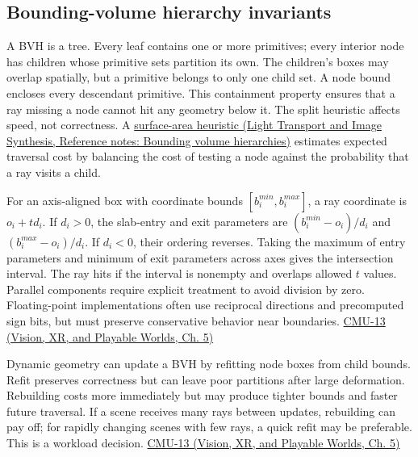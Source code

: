 \subsection{Bounding-volume hierarchy invariants}\label{04-visual-computing-ii-ch029-bounding-volume-hierarchy-invariants}

\hypertarget{04-visual-computing-ii-ch029-bounding-volume-hierarchy-invariants}{}

A BVH is a tree. Every leaf contains one or more primitives; every interior node has children whose primitive sets partition its own. The children's boxes may overlap spatially, but a primitive belongs to only one child set. A node bound encloses every descendant primitive. This containment property ensures that a ray missing a node cannot hit any geometry below it. The split heuristic affects speed, not correctness. A \href{../04-Light-Transport-and-Image-Synthesis/main.pdf\#nameddest=appendix-0b426c47dd78}{surface-area heuristic (Light Transport and Image Synthesis, Reference notes: Bounding volume hierarchies)} estimates expected traversal cost by balancing the cost of testing a node against the probability that a ray visits a child.

For an axis-aligned box with coordinate bounds \([b_i^{min},b_i^{max}]\), a ray coordinate is \(o_i+td_i\). If \(d_i>0\), the slab-entry and exit parameters are \((b_i^{min}-o_i)/d_i\) and \((b_i^{max}-o_i)/d_i\). If \(d_i<0\), their ordering reverses. Taking the maximum of entry parameters and minimum of exit parameters across axes gives the intersection interval. The ray hits if the interval is nonempty and overlaps allowed \(t\) values. Parallel components require explicit treatment to avoid division by zero. Floating-point implementations often use reciprocal directions and precomputed sign bits, but must preserve conservative behavior near boundaries. \href{../07-Vision-XR-and-Playable-Worlds/main.pdf\#nameddest=04-visual-computing-ii-ch036-cmu-13---spatial-data-structures}{CMU-13 (Vision, XR, and Playable Worlds, Ch. 5)}

Dynamic geometry can update a BVH by refitting node boxes from child bounds. Refit preserves correctness but can leave poor partitions after large deformation. Rebuilding costs more immediately but may produce tighter bounds and faster future traversal. If a scene receives many rays between updates, rebuilding can pay off; for rapidly changing scenes with few rays, a quick refit may be preferable. This is a workload decision. \href{../07-Vision-XR-and-Playable-Worlds/main.pdf\#nameddest=04-visual-computing-ii-ch036-cmu-13---spatial-data-structures}{CMU-13 (Vision, XR, and Playable Worlds, Ch. 5)}

